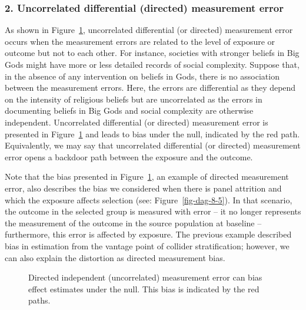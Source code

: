 \documentclass[
  singlecolumn]{article}
\begin{document}
\subsubsection{2. Uncorrelated differential (directed) measurement
error}\label{uncorrelated-differential-directed-measurement-error}

As shown in Figure~\ref{fig-dag-indep-d-effect}, uncorrelated
differential (or directed) measurement error occurs when the measurement
errors are related to the level of exposure or outcome but not to each
other. For instance, societies with stronger beliefs in Big Gods might
have more or less detailed records of social complexity. Suppose that,
in the absence of any intervention on beliefs in Gods, there is no
association between the measurement errors. Here, the errors are
differential as they depend on the intensity of religious beliefs but
are uncorrelated as the errors in documenting beliefs in Big Gods and
social complexity are otherwise independent. Uncorrelated differential
(or directed) measurement error is presented in
Figure~\ref{fig-dag-indep-d-effect} and leads to bias under the null,
indicated by the red path. Equivalently, we may say that uncorrelated
differential (or directed) measurement error opens a backdoor path
between the exposure and the outcome.

Note that the bias presented in Figure~\ref{fig-dag-indep-d-effect}, an
example of directed measurement error, also describes the bias we
considered when there is panel attrition and which the exposure affects
selection (see: Figure~\ref{fig-dag-8-5}). In that scenario, the outcome
in the selected group is measured with error -- it no longer represents
the measurement of the outcome in the source population at baseline --
furthermore, this error is affected by exposure. The previous example
described bias in estimation from the vantage point of collider
stratification; however, we can also explain the distortion as directed
measurement bias.

\begin{figure}


\caption{\label{fig-dag-indep-d-effect}Directed independent
(uncorrelated) measurement error can bias effect estimates under the
null. This bias is indicated by the red paths.}

\end{figure}%
\end{document}
